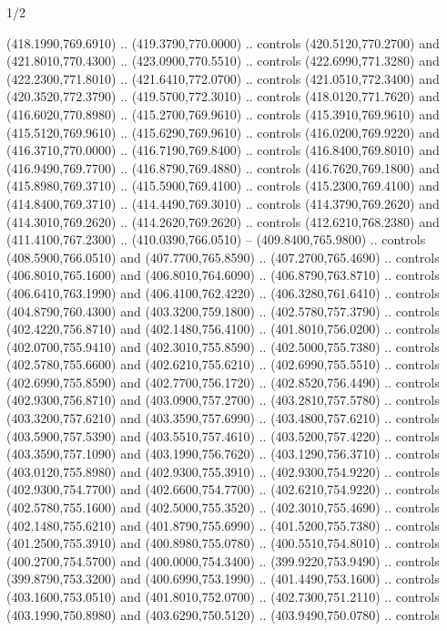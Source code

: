\begin{flagdescription}{1/2}
\begin{scope}[xshift=0.5\flaglength]
\begin{scope}[scale=0.00745\flagwidth,xshift=-12.1mm,yshift=41.7mm]
\begin{scope}[y=0.80pt, x=0.80pt, yscale=-1, xscale=1, inner sep=0pt, outer sep=0pt]
\begin{scope}[cm={{1.33333,0.0,0.0,-1.33333,(0.0,114.66667)}}]
\begin{scope}[scale=0.100]
  (418.1990,769.6910) .. (419.3790,770.0000) .. controls (420.5120,770.2700) and
  (421.8010,770.4300) .. (423.0900,770.5510) .. controls (422.6990,771.3280) and
  (422.2300,771.8010) .. (421.6410,772.0700) .. controls (421.0510,772.3400) and
  (420.3520,772.3790) .. (419.5700,772.3010) .. controls (418.0120,771.7620) and
  (416.6020,770.8980) .. (415.2700,769.9610) .. controls (415.3910,769.9610) and
  (415.5120,769.9610) .. (415.6290,769.9610) .. controls (416.0200,769.9220) and
  (416.3710,770.0000) .. (416.7190,769.8400) .. controls (416.8400,769.8010) and
  (416.9490,769.7700) .. (416.8790,769.4880) .. controls (416.7620,769.1800) and
  (415.8980,769.3710) .. (415.5900,769.4100) .. controls (415.2300,769.4100) and
  (414.8400,769.3710) .. (414.4490,769.3010) .. controls (414.3790,769.2620) and
  (414.3010,769.2620) .. (414.2620,769.2620) .. controls (412.6210,768.2380) and
  (411.4100,767.2300) .. (410.0390,766.0510) -- (409.8400,765.9800) .. controls
  (408.5900,766.0510) and (407.7700,765.8590) .. (407.2700,765.4690) .. controls
  (406.8010,765.1600) and (406.8010,764.6090) .. (406.8790,763.8710) .. controls
  (406.6410,763.1990) and (406.4100,762.4220) .. (406.3280,761.6410) .. controls
  (404.8790,760.4300) and (403.3200,759.1800) .. (402.5780,757.3790) .. controls
  (402.4220,756.8710) and (402.1480,756.4100) .. (401.8010,756.0200) .. controls
  (402.0700,755.9410) and (402.3010,755.8590) .. (402.5000,755.7380) .. controls
  (402.5780,755.6600) and (402.6210,755.6210) .. (402.6990,755.5510) .. controls
  (402.6990,755.8590) and (402.7700,756.1720) .. (402.8520,756.4490) .. controls
  (402.9300,756.8710) and (403.0900,757.2700) .. (403.2810,757.5780) .. controls
  (403.3200,757.6210) and (403.3590,757.6990) .. (403.4800,757.6210) .. controls
  (403.5900,757.5390) and (403.5510,757.4610) .. (403.5200,757.4220) .. controls
  (403.3590,757.1090) and (403.1990,756.7620) .. (403.1290,756.3710) .. controls
  (403.0120,755.8980) and (402.9300,755.3910) .. (402.9300,754.9220) .. controls
  (402.9300,754.7700) and (402.6600,754.7700) .. (402.6210,754.9220) .. controls
  (402.5780,755.1600) and (402.5000,755.3520) .. (402.3010,755.4690) .. controls
  (402.1480,755.6210) and (401.8790,755.6990) .. (401.5200,755.7380) .. controls
  (401.2500,755.3910) and (400.8980,755.0780) .. (400.5510,754.8010) .. controls
  (400.2700,754.5700) and (400.0000,754.3400) .. (399.9220,753.9490) .. controls
  (399.8790,753.3200) and (400.6990,753.1990) .. (401.4490,753.1600) .. controls
  (403.1600,753.0510) and (401.8010,752.0700) .. (402.7300,751.2110) .. controls
  (403.1990,750.8980) and (403.6290,750.5120) .. (403.9490,750.0780) .. controls

\end{scope}
\end{scope}
\end{scope}
\end{scope}
\end{scope}
\end{flagdescription}
